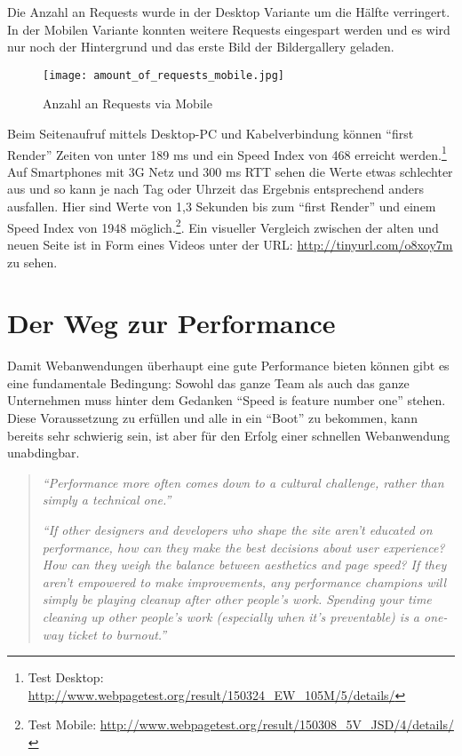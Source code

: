 \begin{itemize}
			Die Anzahl an Requests wurde in der Desktop Variante um die Hälfte verringert. In der Mobilen Variante konnten weitere Requests eingespart werden und es wird nur noch der Hintergrund und das erste Bild der Bildergallery geladen.

			\begin{figure}[htbp]
				\begin{center}
					\texttt{[image: amount\_of\_requests\_mobile.jpg]}
					\caption{Anzahl an Requests via Mobile}
					\label{fig:amount_of_requests_mobile}
				\end{center}
	    \end{figure}

		\end{itemize}

		Beim Seitenaufruf mittels Desktop-PC und Kabelverbindung können "`first Render"' Zeiten von unter 189 ms und ein Speed Index von 468 erreicht werden.\footnote{Test Desktop: \url{http://www.webpagetest.org/result/150324_EW_105M/5/details/}} Auf Smartphones mit 3G Netz und 300 ms RTT sehen die Werte etwas schlechter aus und so kann je nach Tag oder Uhrzeit das Ergebnis entsprechend anders ausfallen. Hier sind Werte von 1,3 Sekunden bis zum "`first Render"' und einem Speed Index von 1948 möglich.\footnote{Test Mobile: \url{http://www.webpagetest.org/result/150308_5V_JSD/4/details/}}. Ein visueller Vergleich zwischen der alten und neuen Seite ist in Form eines Videos unter der URL: \url{http://tinyurl.com/o8xoy7m} zu sehen.
		


\pagebreak
%	
%


\section{Der Weg zur Performance} %
\label{sec:der_weg_zur_performance}
	Damit Webanwendungen überhaupt eine gute Performance  bieten können gibt es eine fundamentale Bedingung: Sowohl das ganze Team als auch das ganze Unternehmen muss hinter dem Gedanken "`Speed is feature number one"'\autocite{holzle10} stehen. Diese Voraussetzung zu erfüllen und alle in ein "`Boot"' zu bekommen, kann bereits sehr schwierig sein, ist aber für den Erfolg einer schnellen Webanwendung unabdingbar.
	\begin{quote}
		\textit{"`Performance more often comes down to a cultural challenge, rather than simply a technical one."'} \autocite[p. 13]{kovalcin15}

		\textit{"`If other designers and developers who shape the site aren’t educated on performance, how can they make the best decisions about user experience? How can they weigh the balance between aesthetics and page speed? If they aren’t empowered to make improvements, any performance champions will simply be playing cleanup after other people’s work. Spending your time cleaning up other people’s work (especially when it’s preventable) is a one-way ticket to burnout."'} \autocite{hogan14}
	\end{quote}

